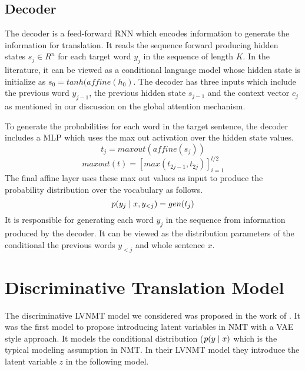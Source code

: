  




\subsection{Decoder}


The decoder is a feed-forward \ac{RNN} which encodes information to generate the information for translation. It reads the sequence forward producing hidden states $s_{j} \in R^{n}$ for each target word $y_{j}$ in the sequence of length $K$. In the literature, it can be viewed as a conditional language model \cite{koehn2017NMT} whose hidden state is initialize as $s_{0} = tanh(affine(h_{0})$. The decoder has three inputs which include the previous word $y_{j-1}$, the previous hidden state $s_{j-1}$ and the context vector $c_{j}$ as mentioned in our discussion on the global attention mechanism. 


To generate the probabilities for each word in the target sentence, the decoder includes a \ac{MLP} which uses the max out activation over the hidden state values. 
\begin{equation}
	t_{j} = maxout(affine(s_{j}))
\end{equation}
\begin{equation}
	maxout(t) = [max(t_{2j -1}, t_{2j})]_{i=1}^{l / 2}
\end{equation}
The final affine layer uses these max out values as input to produce the probability distribution over the vocabulary as follows.
\begin{equation}
p(y_{j} \; | \;{x, y_{<j}}) = gen(t_{j})
\end{equation}
It is responsible for generating each word $y_{j}$ in the sequence from information produced by the decoder. It can be viewed as the distribution parameters of the conditional the previous words $y_{<j}$ and whole sentence $x$.


\section{Discriminative Translation Model}


The discriminative \ac{LVNMT} model we considered was proposed in the work of \citet{Zhang2016VNMT}. It was the first model to propose introducing latent variables in \ac{NMT} with a \ac{VAE} style approach. It models the conditional distribution ($p(y \; | \;{x})$ which is the typical modeling assumption in \ac{NMT}. In their \ac{LVNMT} model they introduce the latent variable $z$ in the following model. 

